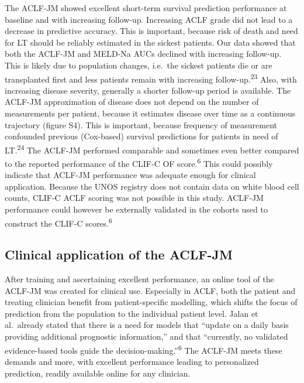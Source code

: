 \documentclass[11pt,english,]{book} %
\begin{document}
The ACLF-JM showed excellent short-term survival prediction performance at baseline and with increasing follow-up. Increasing ACLF grade did not lead to a decrease in predictive accuracy. This is important, because risk of death and need for LT should be reliably estimated in the sickest patients. Our data showed that both the ACLF-JM and MELD-Na AUCs declined with increasing follow-up. This is likely due to population changes, i.e.~the sickest patients die or are transplanted first and less patients remain with increasing follow-up.\textsuperscript{23} Also, with increasing disease severity, generally a shorter follow-up period is available. The ACLF-JM approximation of disease does not depend on the number of measurements per patient, because it estimates disease over time as a continuous trajectory (figure S4). This is important, because frequency of measurement confounded previous (Cox-based) survival predictions for patients in need of LT.\textsuperscript{24} The ACLF-JM performed comparable and sometimes even better compared to the reported performance of the CLIF-C OF score.\textsuperscript{6} This could possibly indicate that ACLF-JM performance was adequate enough for clinical application. Because the UNOS registry does not contain data on white blood cell counts, CLIF-C ACLF scoring was not possible in this study. ACLF-JM performance could however be externally validated in the cohorts used to construct the CLIF-C scores.\textsuperscript{6}

\hypertarget{clinical-application-of-the-aclf-jm-2}{%
\subsection*{Clinical application of the ACLF-JM}\label{clinical-application-of-the-aclf-jm-2}}

After training and ascertaining excellent performance, an online tool of the ACLF-JM was created for clinical use. Especially in ACLF, both the patient and treating clinician benefit from patient-specific modelling, which shifts the focus of prediction from the population to the individual patient level. Jalan et al.~already stated that there is a need for models that ``update on a daily basis providing additional prognostic information,'' and that ``currently, no validated evidence-based tools guide the decision-making.''\textsuperscript{6} The ACLF-JM meets these demands and more, with excellent performance leading to personalized prediction, readily available online for any clinician.
\end{document}

